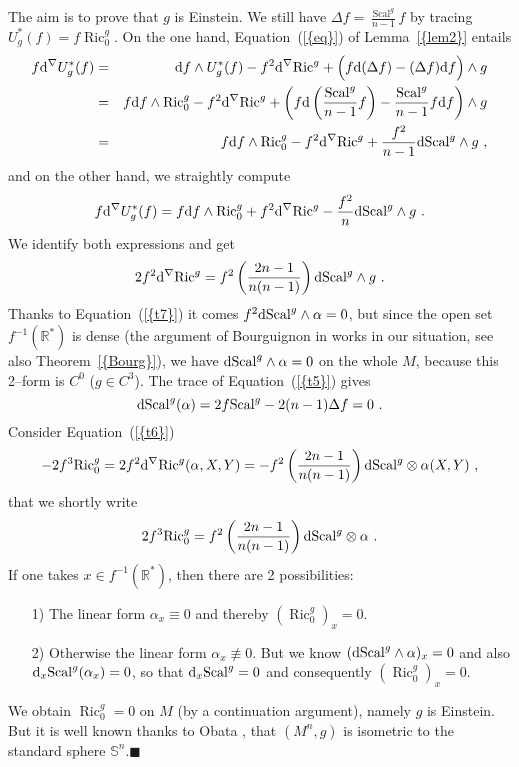 \documentclass[a4paper,11pt,leqno]{amsart}
\numberwithin{equation}{section}
\theoremstyle{main}
\begin{document}
\proof The aim is to prove that $g$ is Einstein. We still have  $\Delta f= \frac{{\operatorname{Scal}}^g}{n-1}f$ by tracing $U_g^* (f)= f {\operatorname{Ric}}^g_0$. On the one hand, Equation~({\ref{{eq}}}) of Lemma~{\ref{{lem2}}} entails
\begin{eqnarray*}
	f{{\rm d}} ^\nabla U_g^* (f) &=& {{\rm d}} f \wedge U_g^*(f) -f^2 {{\rm d}} ^\nabla{\operatorname{Ric}}^g +\Big( f{{\rm d}} (\Delta f) - (\Delta f) {{\rm d}} f\Big)\wedge g \\
	&=&f{{\rm d}} f\wedge {\operatorname{Ric}}^g_0 -f^2 {{\rm d}} ^\nabla{\operatorname{Ric}}^g +\left( f{{\rm d}} \left(\frac{{\operatorname{Scal}}^g}{n-1}f\right) -  \frac{{\operatorname{Scal}}^g}{n-1}f{{\rm d}} f\right)\wedge g\\
	&=&f{{\rm d}} f\wedge {\operatorname{Ric}}^g_0 -f^2 {{\rm d}} ^\nabla{\operatorname{Ric}}^g  + \frac{f^2}{n-1}{{\rm d}}{\operatorname{Scal}}^g \wedge g \ ,
\end{eqnarray*}
and on the other hand, we straightly compute
$$f{{\rm d}} ^\nabla U_g^* (f) =f{{\rm d}} f \wedge{\operatorname{Ric}}^g_0 + f^2 {{\rm d}} ^\nabla{\operatorname{Ric}}^g  - \frac{f^2}{n}{{\rm d}}{\operatorname{Scal}}^g \wedge g   \ .$$
We identify both expressions and get
$$ 2 f^2 {{\rm d}} ^\nabla{\operatorname{Ric}}^g = f^2 \left(\frac{2n-1}{n(n-1)}\right){{\rm d}}{\operatorname{Scal}}^g \wedge g \ .  $$
Thanks to Equation~({\ref{{t7}}}) it comes $f^2 {{\rm d}}{\operatorname{Scal}}^g \wedge \alpha =0$, but since the open set $f^{-1}({{\mathbb R}}^*)$ is dense  (the argument of Bourguignon in \cite{B} works in our situation, see also Theorem~{\ref{{Bourg}}}), we  have $ {{\rm d}}{\operatorname{Scal}}^g \wedge \alpha =0$ on the whole $M$, because this 2--form is $C^0$ ($g\in C^3$). The trace of Equation~({\ref{{t5}}}) gives
$${{\rm d}}{\operatorname{Scal}}^g (\alpha)= 2f{\operatorname{Scal}}^g - 2(n-1)\Delta f =0 \ .$$
Consider Equation~({\ref{{t6}}})
$$-2f^3{\operatorname{Ric}}^g_0= 2 f^2{{\rm d}} ^\nabla{\operatorname{Ric}}^g (\alpha,X,Y)= -f^2 \left(\frac{2n-1}{n(n-1)}\right){{\rm d}} {\operatorname{Scal}}^g \otimes \alpha (X,Y) \ ,$$
that we shortly write 
$$ 2f^3{\operatorname{Ric}}^g_0=f^2 \left(\frac{2n-1}{n(n-1)}\right){{\rm d}} {\operatorname{Scal}}^g \otimes \alpha \ .$$
If one takes  $x\in f^{-1}({{\mathbb R}}^*)$, then there are 2 possibilities:
\begin{enumerate}
	\item[1)] The linear form $\alpha_x\equiv0$ and thereby $({\operatorname{Ric}}^g_0)_x=0$.
	\item[2)] Otherwise the linear form $\alpha_x\not\equiv 0$. But we know  $ ({{\rm d}}{\operatorname{Scal}}^g \wedge \alpha)_x =0$ and also ${{{\rm d}}_x{\operatorname{Scal}}^g(\alpha_x)=0}$,  so that ${{\rm d}}_x{\operatorname{Scal}}^g=0$ and consequently $({\operatorname{Ric}}^g_0)_x=0$.
\end{enumerate}
We obtain ${\operatorname{Ric}}^g_0=0$ on $M$ (by a continuation argument), namely $g$ is Einstein. But it is well known thanks to Obata \cite{O}, that $(M^n,g)$ is isometric to the standard sphere ${{\mathbb S^{n}}}$.{\hfill $\blacksquare$ \medskip \\} 
\end{document}
